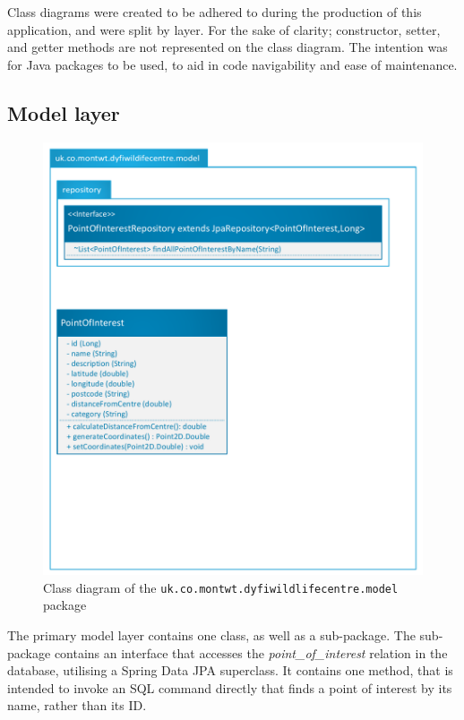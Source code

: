 Class diagrams were created to be adhered to during the production of this application, and were split by layer. For the sake of clarity; constructor, setter, and getter methods are not represented on the class diagram. The intention was for Java packages to be used, to aid in code navigability and ease of maintenance.

\subsection{Model layer}
\begin{figure}[!ht]
	\includegraphics[scale=0.5]{diagrams/model}
	\caption{Class diagram of the \texttt{uk.co.montwt.dyfiwildlifecentre.model} package}
\end{figure}	

The primary model layer contains one class, as well as a sub-package. The sub-package contains an interface that accesses the \textit{point\_of\_interest} relation in the database, utilising a Spring Data JPA superclass. It contains one method, that is intended to invoke an SQL command directly that finds a point of interest by its name, rather than its ID.

